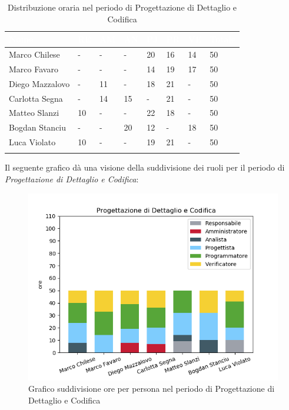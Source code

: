 \begin{longtable}{|C{.30\textwidth}|C{.06\textwidth}|C{.06\textwidth}|C{.06\textwidth} | C{.06\textwidth}| C{.06\textwidth} | C{.06\textwidth} | C{.10\textwidth} |}
	\hline
		\textbf{\textcolor{white}{Nome}} & \textbf{\textcolor{white}{RE}} & \textbf{\textcolor{white}{AM}} & \textbf{\textcolor{white}{AN}} & \textbf{\textcolor{white}{PJ}} & \textbf{\textcolor{white}{PR}} & \textbf{\textcolor{white}{VE}} & \textbf{\textcolor{white}{Totale}}\\
	\hline 
	Marco Chilese & - & - & - & 20 & 16 & 14 & 50 \\
	\hline
	Marco Favaro &  - & - & - & 14 & 19 & 17 & 50 \\
	\hline
	Diego Mazzalovo & - & 11 & - & 18 & 21 & - & 50 \\
	\hline
	Carlotta Segna & - & 14 & 15 & - & 21 & - & 50 \\
	\hline
	Matteo Slanzi & 10 & - & - & 22 & 18 & - & 50 \\
	\hline
	Bogdan Stanciu & - & - & 20 & 12 & - & 18 & 50 \\
	\hline
	Luca Violato & 10 & - & - & 19 & 21 & - & 50 \\   
	\hline


\caption{Distribuzione oraria nel periodo di Progettazione di Dettaglio e Codifica}
\label{Distribuzione oraria pdc}
\end{longtable}

Il seguente grafico dà una visione della suddivisione dei ruoli per il periodo di \textit{Progettazione di Dettaglio e Codifica}:

\begin{figure}[H]
	\centering
	\includegraphics[width=1\linewidth]{./images/fig_pdc.png}
	\caption{Grafico suddivisione ore per persona nel periodo di Progettazione di Dettaglio e Codifica}
	\label{fig:grafico suddivione ruoli periodo pdc}
\end{figure}


